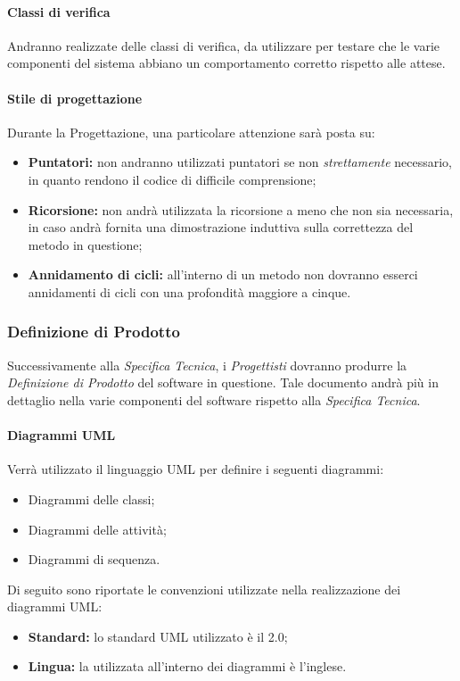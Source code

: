 \paragraph{Classi di verifica\\}
\label{sp_classiverifica}
Andranno realizzate delle classi di verifica, da utilizzare per testare che le varie componenti del sistema abbiano un comportamento corretto rispetto alle attese.

\paragraph{Stile di progettazione\\}
\label{stilediprogettazione}
Durante la Progettazione, una particolare attenzione sarà posta su:
\begin{itemize}
\item\textbf{Puntatori:} non andranno utilizzati puntatori se non \emph{strettamente} necessario, in quanto rendono il codice di difficile comprensione;
\item\textbf{Ricorsione:} non andrà utilizzata la ricorsione a meno che non sia necessaria, in caso andrà fornita una dimostrazione induttiva sulla correttezza del metodo in questione;
\item\textbf{Annidamento di cicli:} all'interno di un metodo non dovranno esserci annidamenti di cicli con una profondità maggiore a cinque.
\end{itemize}

\subsubsection{Definizione di Prodotto}
\label{definizione}
Successivamente alla \emph{Specifica Tecnica}, i \emph{Progettisti} dovranno produrre la \emph{Definizione di Prodotto} del software in questione. Tale documento andrà più in dettaglio nella varie componenti del software rispetto alla \emph{Specifica Tecnica}.

\paragraph{Diagrammi UML\\}
\label{diagrammi_uml_dp}
Verrà utilizzato il linguaggio UML\glossario{} per definire i seguenti diagrammi:
\begin{itemize}
\item Diagrammi delle classi;
\item Diagrammi delle attività;
\item Diagrammi di sequenza.
\end{itemize}
Di seguito sono riportate le convenzioni utilizzate nella realizzazione dei diagrammi UML\glossario{}:
\begin{itemize}
	\item\textbf{Standard:} lo standard UML\glossario{} utilizzato è il 2.0;
	\item\textbf{Lingua:} la utilizzata all'interno dei diagrammi è l'inglese.
\end{itemize}

